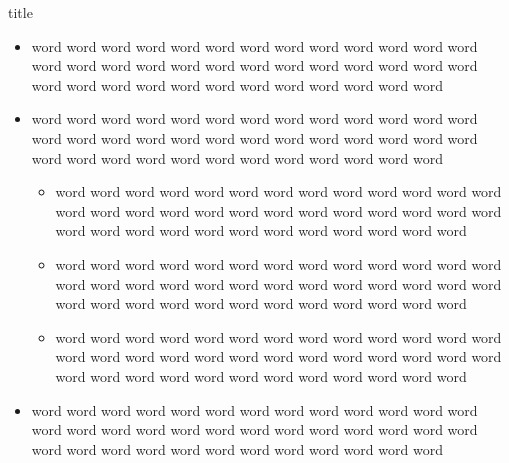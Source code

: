 \documentclass[11pt]{beamer}
\begin{document}
\begin{frame}{title}
\begin{itemize}
  \item word word word word word word word word word word word word word word word word word word word word word word word word word word word word word word word word word word word word word word 
  \item word word word word word word word word word word word word word word word word word word word word word word word word word word word word word word word word word word word word word word 
\begin{itemize}
  \item word word word word word word word word word word word word word word word word word word word word word word word word word word word word word word word word word word word word word word 
  \item word word word word word word word word word word word word word word word word word word word word word word word word word word word word word word word word word word word word word word 
  \item word word word word word word word word word word word word word word word word word word word word word word word word word word word word word word word word word word word word word word 
\end{itemize}
  \item word word word word word word word word word word word word word word word word word word word word word word word word word word word word word word word word word word word word word word 
\end{itemize}
\end{frame}
\end{document}
